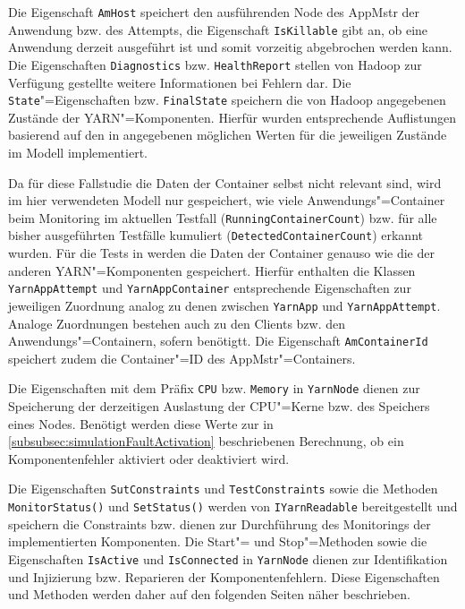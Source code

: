 Die Eigenschaft \texttt{AmHost} speichert den ausführenden Node des \ac{AppMstr} der Anwendung bzw. des Attempts, die Eigenschaft \texttt{IsKillable} gibt an, ob eine Anwendung derzeit ausgeführt ist und somit vorzeitig abgebrochen werden kann.
Die Eigenschaften \texttt{Diagnostics} bzw. \texttt{HealthReport} stellen von Hadoop zur Verfügung gestellte weitere Informationen bei Fehlern dar.
Die \texttt{State}"=Eigenschaften bzw. \texttt{FinalState} speichern die von Hadoop angegebenen Zustände der \ac{YARN}"=Komponenten.
Hierfür wurden entsprechende Auflistungen basierend auf den in \cite{HadoopRmApi271} angegebenen möglichen Werten für die jeweiligen Zustände im Modell implementiert.

Da für diese Fallstudie die Daten der Container selbst nicht relevant sind, wird im hier verwendeten Modell nur gespeichert, wie viele Anwendungs"=Container beim Monitoring im aktuellen Testfall (\texttt{RunningContainerCount}) bzw. für alle bisher ausgeführten Testfälle kumuliert (\texttt{DetectedContainerCount}) erkannt wurden.
Für die Tests in \cite{Eberhardinger2018} werden die Daten der Container genauso wie die der anderen \ac{YARN}"=Komponenten gespeichert.
Hierfür enthalten die Klassen \texttt{YarnAppAttempt} und \texttt{YarnAppContainer} entsprechende Eigenschaften zur jeweiligen Zuordnung analog zu denen zwischen \texttt{YarnApp} und \texttt{YarnAppAttempt}.
Analoge Zuordnungen bestehen auch zu den Clients bzw. den Anwendungs"=Containern, sofern benötigtt.
Die Eigenschaft \texttt{AmContainerId} speichert zudem die Container"=ID des \ac{AppMstr}"=Containers.

Die Eigenschaften mit dem Präfix \texttt{CPU} bzw. \texttt{Memory} in \texttt{YarnNode} dienen zur Speicherung der derzeitigen Auslastung der CPU"=Kerne bzw. des Speichers eines Nodes.
Benötigt werden diese Werte zur in \cref{subsubsec:simulationFaultActivation} beschriebenen Berechnung, ob ein Komponentenfehler aktiviert oder deaktiviert wird.

Die Eigenschaften \texttt{SutConstraints} und \texttt{TestConstraints} sowie die Methoden \texttt{MonitorStatus()} und \texttt{SetStatus()} werden von \texttt{IYarnReadable} bereitgestellt und speichern die Constraints bzw. dienen zur Durchführung des Monitorings der implementierten Komponenten.
Die Start"= und Stop"=Methoden sowie die Eigenschaften \texttt{IsActive} und \texttt{IsConnected} in \texttt{YarnNode} dienen zur Identifikation und Injizierung bzw. Reparieren der Komponentenfehlern.
Diese Eigenschaften und Methoden werden daher auf den folgenden Seiten näher beschrieben.

